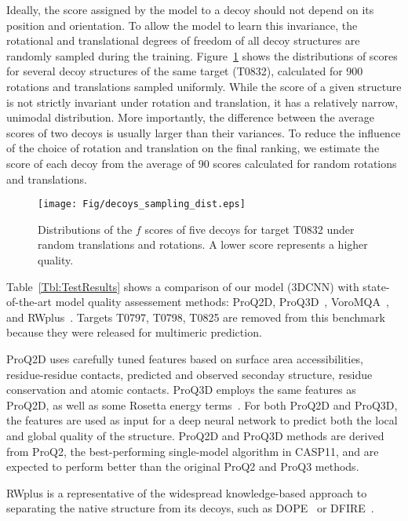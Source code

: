 Ideally, the score assigned by the model to a decoy should not depend
on its position and orientation.  To allow the model to learn this
invariance, the rotational and translational degrees of freedom of all
decoy structures are randomly sampled during the training.
%
Figure~\ref{Fig:DecoysScoreDistribution} shows the distributions of
scores for several decoy structures of the same target (T0832),
calculated for 900 rotations and translations sampled uniformly.
While the score of a given structure is not strictly invariant under
rotation and translation, it has a relatively narrow, unimodal
distribution.  More importantly, the difference between the average
scores of two decoys is usually larger than their variances. To reduce
the influence of the choice of rotation and translation on the final
ranking, we estimate the score of each decoy from the average of 90
scores calculated for random rotations and translations.

\begin{figure}[H]
    \centering
    \texttt{[image: Fig/decoys\_sampling\_dist.eps]}
%
    \caption{Distributions of the $f$ scores of five decoys for target
    T0832 under random translations and rotations. A lower score
    represents a higher quality.}
%
    \label{Fig:DecoysScoreDistribution}
\end{figure}

Table~\ref{Tbl:TestResults} shows a comparison of our model (3DCNN)
with state-of-the-art model quality assessement methods: ProQ2D,
ProQ3D~\cite{uziela2017proq3d}, VoroMQA~\cite{olechnovivc2017voromqa},
and RWplus~\cite{zhang2010novel}.
Targets T0797, T0798, T0825 are removed from this benchmark because
they were released for multimeric prediction.

%
ProQ2D uses carefully tuned features based on surface area
accessibilities, residue-residue contacts, predicted and observed
seconday structure, residue conservation and atomic contacts. ProQ3D
employs the same features as ProQ2D, as well as some Rosetta energy
terms~\cite{leaverfay2011rosetta}. For both ProQ2D and ProQ3D, the
features are used as input for a deep neural network to predict both
the local and global quality of the structure.
ProQ2D and ProQ3D methods are derived from ProQ2, the best-performing
single-model algorithm in CASP11, and are expected to perform better
than the original ProQ2 and ProQ3 methods.
%

RWplus is a representative of the widespread knowledge-based approach
to separating the native structure from its decoys, such as
DOPE~\cite{shen2006statistical}  or DFIRE~\cite{zhou2002distance}.
%

